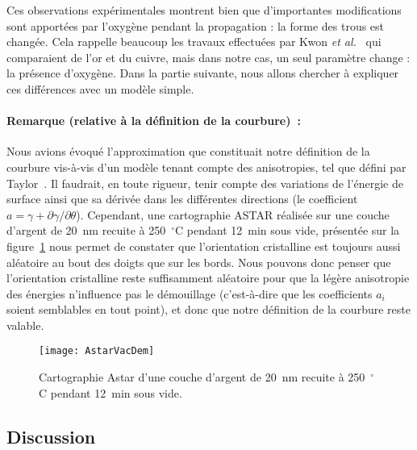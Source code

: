 Ces observations expérimentales montrent bien que d’importantes modifications sont apportées par l’oxygène pendant la propagation : la forme des trous est changée. Cela rappelle beaucoup les travaux effectuées par Kwon\textit{ et al.}~\cite{kwon2003comparison} qui comparaient de l’or et du cuivre, mais dans notre cas, un seul paramètre change : la présence d’oxygène. Dans la partie suivante, nous allons chercher à expliquer ces différences avec un modèle simple.\par 

\paragraph*{Remarque (relative à la définition de la courbure)~:}
Nous avions évoqué l’approximation que constituait notre définition de la courbure vis-à-vis d’un modèle tenant compte des anisotropies, tel que défini par Taylor~\cite{taylor1992ii}. Il faudrait, en toute rigueur, tenir compte des variations de l’énergie de surface ainsi que sa dérivée dans les différentes directions (le coefficient $a=\gamma+\partial\gamma/\partial\theta$). Cependant, une cartographie ASTAR réalisée sur une couche d’argent de 20~nm recuite à 250~$^\circ$C pendant 12~min sous vide, présentée sur la figure~\ref{astarVacDem} nous permet de constater que l’orientation cristalline est toujours aussi aléatoire au bout des doigts que sur les bords. Nous pouvons donc penser que l’orientation cristalline reste suffisamment aléatoire pour que la légère anisotropie des énergies n’influence pas le démouillage (c'est-à-dire que les coefficients $a_i$ soient semblables en tout point), et donc que notre définition de la courbure reste valable.\par 

\begin{figure}[!htb]
\centering
\texttt{[image: AstarVacDem]}
\caption{Cartographie Astar d’une couche d’argent de 20~nm recuite à 250~$^\circ$C pendant 12~min sous vide.}
\label{astarVacDem}
\end{figure}

		\subsection{Discussion}

